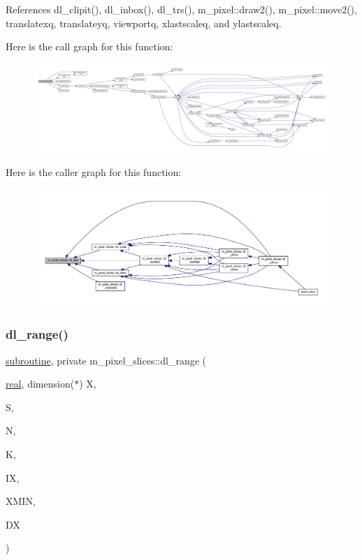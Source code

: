 References dl\+\_\+clipit(), dl\+\_\+inbox(), dl\+\_\+trs(), m\+\_\+pixel\+::draw2(), m\+\_\+pixel\+::move2(), translatexq, translateyq, viewportq, xlastscaleq, and ylastscaleq.

Here is the call graph for this function\+:
\nopagebreak
\begin{figure}[H]
\begin{center}
\leavevmode
\includegraphics[width=350pt]{namespacem__pixel__slices_aa70737b5f5945b2f513163ee5c40942d_cgraph}
\end{center}
\end{figure}
Here is the caller graph for this function\+:
\nopagebreak
\begin{figure}[H]
\begin{center}
\leavevmode
\includegraphics[width=350pt]{namespacem__pixel__slices_aa70737b5f5945b2f513163ee5c40942d_icgraph}
\end{center}
\end{figure}
\mbox{\label{namespacem__pixel__slices_a47408b6c6411a3c3cb3419b319e57978}} 
\subsubsection{\texorpdfstring{dl\+\_\+range()}{dl\_range()}}
{\footnotesize\ttfamily \hyperlink{M__stopwatch_83_8txt_acfbcff50169d691ff02d4a123ed70482}{subroutine}, private m\+\_\+pixel\+\_\+slices\+::dl\+\_\+range (\begin{DoxyParamCaption}\item[{\hyperlink{read__watch_83_8txt_abdb62bde002f38ef75f810d3a905a823}{real}, dimension($\ast$)}]{X,  }\item[{}]{S,  }\item[{}]{N,  }\item[{}]{K,  }\item[{}]{IX,  }\item[{}]{X\+M\+IN,  }\item[{}]{DX }\end{DoxyParamCaption})\hspace{0.3cm}{\ttfamily [private]}}


